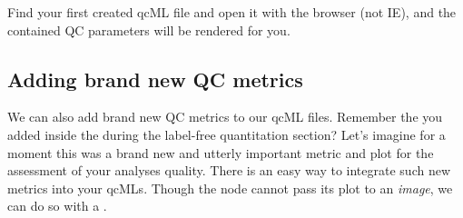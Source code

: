 \begin{task}
Find your first created qcML file and open it with the browser (not IE), and the contained QC parameters will be rendered for you.
\end{task}


\subsection{Adding brand new QC metrics}
\label{Adding brand new QC metrics}

We can also add brand new QC metrics to our qcML files. Remember the  you added inside the  during the label-free quantitation section? %
 Let's imagine for a moment this was a brand new and utterly important metric and plot for the assessment of your analyses quality. There is an easy way to integrate such new metrics into your qcMLs. Though the  node cannot pass its plot to an \textit{image}, we can do so with a . 

